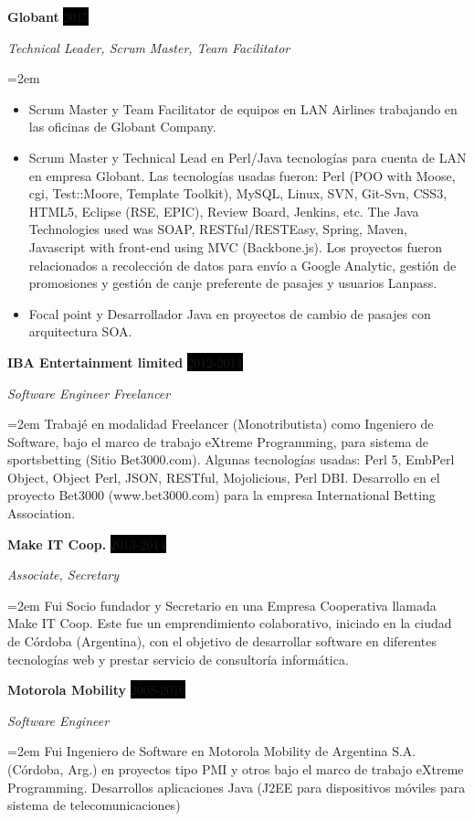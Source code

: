 \documentclass[paper=a4,fontsize=11pt]{scrartcl} %
\newcommand{\sepspace}{\vspace*{1em}}		%
\newcommand{\EducationEntry}[4]{
		\noindent \textbf{#1} \hfill      %
		\colorbox{Black}{%
			\parbox{6em}{%
			\hfill\color{White}#2}} \par  %
		\noindent \textit{#3} \par        %
		\noindent\hangindent=2em\hangafter=0 \small #4 %
		\normalsize \par}
\newcommand{\WorkEntry}[4]{				  %
		\noindent \textbf{#1} \hfill      %
		\colorbox{Black}{\color{White}#2} \par  %
		\noindent \textit{#3} \par              %
		\noindent\hangindent=2em\hangafter=0 \small #4 %
		\normalsize \par}
\begin{document}
\sepspace

\WorkEntry{Globant}{2015}{Technical Leader, Scrum Master, Team Facilitator}
{
\begin{itemize}
\item Scrum Master y Team Facilitator de equipos en LAN Airlines trabajando en las oficinas de Globant Company.
\item Scrum Master y Technical Lead en Perl/Java tecnologías para cuenta de LAN en empresa Globant. Las tecnologías usadas fueron: Perl (POO with Moose, cgi, Test::Moore, Template Toolkit), MySQL, Linux, SVN, Git-Svn, CSS3, HTML5, Eclipse (RSE, EPIC), Review Board, Jenkins, etc. The Java Technologies used was SOAP, RESTful/RESTEasy, Spring, Maven, Javascript with front-end using MVC (Backbone.js). Los proyectos fueron  relacionados a recolección de datos para envío a Google Analytic, gestión de promosiones y gestión de canje preferente de pasajes y usuarios Lanpass.
\item Focal point y Desarrollador Java en proyectos de cambio de pasajes con arquitectura SOA.
\end{itemize}
}

\sepspace

\WorkEntry{IBA Entertainment limited}{2012-2014}{Software Engineer Freelancer}
{Trabajé en modalidad Freelancer (Monotributista) como Ingeniero de Software, bajo el marco de trabajo eXtreme Programming, para sistema de sportsbetting (Sitio Bet3000.com). Algunas tecnologías usadas: Perl 5, EmbPerl Object, Object Perl, JSON, RESTful, Mojolicious, Perl DBI. Desarrollo en el proyecto Bet3000 (www.bet3000.com) para la empresa International Betting Association.}

\sepspace

\WorkEntry{Make IT Coop.}{2013-2014}{Associate, Secretary}{
Fui Socio fundador y Secretario en una Empresa Cooperativa llamada Make IT Coop. Este fue un emprendimiento colaborativo, iniciado en la ciudad de Córdoba (Argentina), con el objetivo de desarrollar software en diferentes tecnologías web y prestar servicio de consultoría informática.
}

\sepspace

\WorkEntry{Motorola Mobility}{2008-2010}{Software Engineer}
{Fui Ingeniero de Software en Motorola Mobility de Argentina S.A. (Córdoba, Arg.) en proyectos tipo PMI y otros bajo el marco de trabajo eXtreme Programming. Desarrollos aplicaciones Java (J2EE para dispositivos móviles para sistema de telecomunicaciones)}
\end{document}
